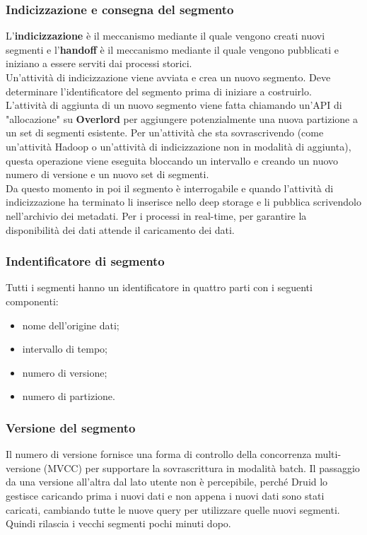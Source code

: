 \documentclass{article}
\begin{document}
\subsubsection{Indicizzazione e consegna del segmento}
L'\textbf{indicizzazione} è il meccanismo mediante il quale vengono creati nuovi segmenti e l'\textbf{handoff} è il meccanismo mediante il quale vengono pubblicati e iniziano a essere serviti dai processi storici. \\
Un'attività di indicizzazione viene avviata e crea un nuovo segmento. Deve determinare l'identificatore del segmento prima di iniziare a costruirlo.\\ L'attività di aggiunta di un nuovo segmento viene fatta chiamando un'API di "allocazione" su \textbf{Overlord} per aggiungere potenzialmente una nuova partizione a un set di segmenti esistente.  Per un'attività che sta sovrascrivendo (come un'attività Hadoop o un'attività di indicizzazione non in modalità di aggiunta), questa operazione viene eseguita bloccando un intervallo e creando un nuovo numero di versione e un nuovo set di segmenti.\\
Da questo momento in poi il segmento è interrogabile e quando l'attività di indicizzazione ha terminato li inserisce nello deep storage  e li pubblica scrivendolo nell'archivio dei metadati. Per i processi in real-time, per garantire la disponibilità dei dati attende il caricamento dei dati.
\subsubsection{Indentificatore di segmento}
Tutti i segmenti hanno un identificatore in quattro parti con i seguenti componenti:
\begin{itemize}
    \item nome dell'origine dati;
    \item intervallo di tempo;
    \item numero di versione;
    \item numero di partizione.
\end{itemize}
\subsubsection{Versione del segmento}
Il numero di versione fornisce una forma di controllo della concorrenza multi-versione (MVCC) per supportare la sovrascrittura in modalità batch. Il passaggio da una versione all'altra dal lato utente non è percepibile,  perché Druid lo gestisce caricando prima i nuovi dati e non appena i nuovi dati sono stati caricati, cambiando tutte le nuove query per utilizzare quelle nuovi segmenti. Quindi rilascia i vecchi segmenti pochi minuti dopo. 
\end{document}
